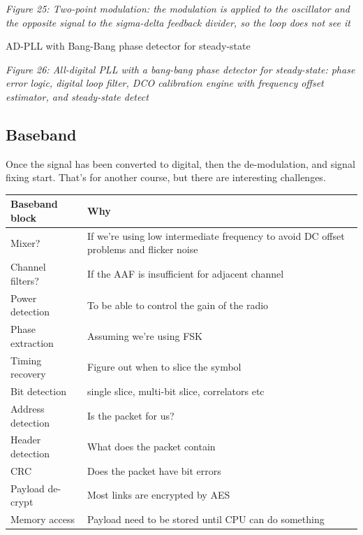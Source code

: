 {
\centering
{}
}

\emph{Figure 25: Two-point modulation: the modulation is applied to the
oscillator and the opposite signal to the sigma-delta feedback divider,
so the loop does not see it}

AD-PLL with Bang-Bang phase detector for steady-state


{
\centering
{}
}

\emph{Figure 26: All-digital PLL with a bang-bang phase detector for
steady-state: phase error logic, digital loop filter, DCO calibration
engine with frequency offset estimator, and steady-state detect}

\subsection{Baseband}\label{baseband}

Once the signal has been converted to digital, then the de-modulation,
and signal fixing start. That's for another course, but there are
interesting challenges.

\begin{longtable}[]{@{}
  >{\raggedright\arraybackslash}p{}
  >{\raggedright\arraybackslash}p{}@{}}
\toprule\noalign{}
\begin{minipage}[b]{\linewidth}\raggedright
Baseband block
\end{minipage} & \begin{minipage}[b]{\linewidth}\raggedright
Why
\end{minipage} \\
\midrule\noalign{}
\endhead
\bottomrule\noalign{}
\endlastfoot
Mixer? & If we're using low intermediate frequency to avoid DC offset
problems and flicker noise \\
Channel filters? & If the AAF is insufficient for adjacent channel \\
Power detection & To be able to control the gain of the radio \\
Phase extraction & Assuming we're using FSK \\
Timing recovery & Figure out when to slice the symbol \\
Bit detection & single slice, multi-bit slice, correlators etc \\
Address detection & Is the packet for us? \\
Header detection & What does the packet contain \\
CRC & Does the packet have bit errors \\
Payload de-crypt & Most links are encrypted by AES \\
Memory access & Payload need to be stored until CPU can do something \\
\end{longtable}

